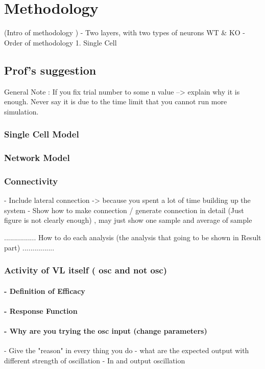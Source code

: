 \chapter{Methodology}

(Intro of methodology )
- Two layers, with two types of neurons  WT \& KO 
- Order of methodology 
1. Single Cell  
\section{Prof's suggestion}
General Note : If you fix trial number to some n value --> explain why it is enough.  Never say it is due to the time limit that you cannot run more simulation. 
\subsection{Single Cell Model}
\subsection{Network Model}
\subsection{Connectivity}
 - Include lateral connection -> because you spent a lot of time building up the system
 - Show how to make connection / generate connection in detail (Just figure is not clearly enough) , may just show one sample and average of sample
 \begin{center}
 ................
How to do each analysis (the analysis that going to be shown in Result part)
 ................
 \end{center}
 \subsection{Activity of VL itself ( osc and not osc)}
 \subsubsection{- Definition of Efficacy}
 \subsubsection{- Response Function}
 \subsubsection{- Why are you trying the osc input (change parameters)}
- Give the "reason" in every thing you do
- what are the expected  output with different strength of oscillation
- In and output oscillation
